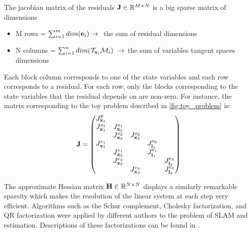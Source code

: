The jacobian matrix of the residuals ${\bf J} \in \mathbb{R}^{M \times N}$ is a big sparse matrix of dimensions 
\begin{itemize}
    \item M rows = $\sum_{i=1}^{m}dim({\bf e}_i) \rightarrow~$ the sum of residual dimensions
    \item N columns = $\sum_{i=1}^{n}dim(\mathcal{T}_{{\bf x}_i}\mathcal{M}_i)~\rightarrow$ the sum of variables tangent spaces dimensions 
\end{itemize}   

Each block column corresponds to one of the state variables and each row corresponds to a residual. For each row, only the blocks corresponding to the
state variables that the residual depends on are non-zero. For instance, the matrix corresponding to the toy problem described in \ref{fig:toy_problem} is:
\begin{equation}
    {\bf J}=
    \begin{pmatrix}
        J^{p}_{{\bf x}_1} &   &     &     &     \\
       J^{o_1}_{{\bf x}_1} & J^{o_1}_{{\bf x}_2}  &     &     &     \\
                       & J^{o_2}_{{\bf x}_2}  & J^{o_2}_{{\bf x}_3}   &     &     \\
       J^{e_1}_{{\bf x}_1} &                  &     &  J^{o_2}_{{\bf l}_1}   &     \\
                       & J^{e_1}_{{\bf x}_2}  &     &  J^{e_1}_{{\bf l}_1}   &     \\
                       & J^{e_2}_{{\bf x}_2}  &     &     &  J^{e_2}_{{\bf l}_2}   \\
                       &                  & J^{e_3}_{{\bf x}_3}    &     &  J^{e_3}_{{\bf l}_2}   \\
    \end{pmatrix}
    \label{eq:sparse_jac}
\end{equation}


The approximate Hessian matrix ${\bf H} \in \mathbb{R}^{N \times N}$ displays a similarly remarkable sparsity which makes the resolution of the linear system
at each step very efficient. Algorithms such as the Schur complement, Cholesky factorization, and QR factorization were applied by different authors to the 
problem of SLAM and estimation. Descriptions of these factorizations can be found in \cite{sola2017course, dellaert2017factor}.







